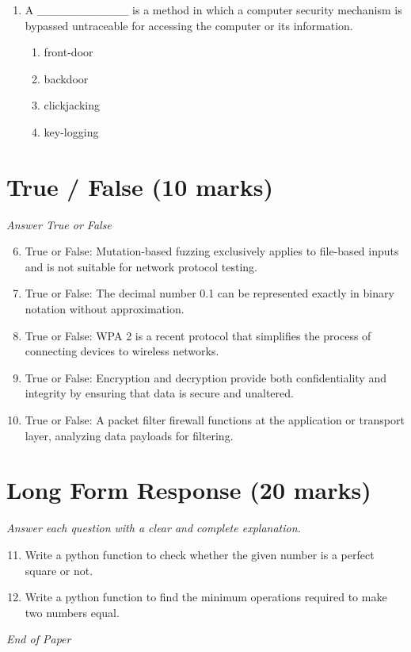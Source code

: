 \documentclass[12pt]{article}
\begin{document}
\begin{enumerate}[label=\arabic*.]
\begin{enumerate}[label=(\alph*)]
    \item No, I cannot compute the key.
    \item Yes, the key is k = m xor c.
    \item I can only compute half the bits of the key.
    \item Yes, the key is k = m xor m.
\end{enumerate}
\item A \_\_\_\_\_\_\_\_\_\_\_ is a method in which a computer security mechanism is bypassed untraceable for accessing the computer or its information.
\begin{enumerate}[label=(\alph*)]
    \item front-door
    \item backdoor
    \item clickjacking
    \item key-logging
\end{enumerate}
\end{enumerate}

\section*{True / False (10 marks)}
\textit{Answer True or False}
\begin{enumerate}[label=\arabic*.]
\setcounter{enumi}{5}
\item True or False: Mutation-based fuzzing exclusively applies to file-based inputs and is not suitable for network protocol testing.
\item True or False: The decimal number 0.1 can be represented exactly in binary notation without approximation.
\item True or False: WPA 2 is a recent protocol that simplifies the process of connecting devices to wireless networks.
\item True or False: Encryption and decryption provide both confidentiality and integrity by ensuring that data is secure and unaltered.
\item True or False: A packet filter firewall functions at the application or transport layer, analyzing data payloads for filtering.
\end{enumerate}

\section*{Long Form Response (20 marks)}
\textit{Answer each question with a clear and complete explanation.}
\begin{enumerate}[label=\arabic*.]
\setcounter{enumi}{10}
\item Write a python function to check whether the given number is a perfect square or not.
\item Write a python function to find the minimum operations required to make two numbers equal.
\end{enumerate}

\vfill
\noindent\textit{End of Paper}
\end{document}
